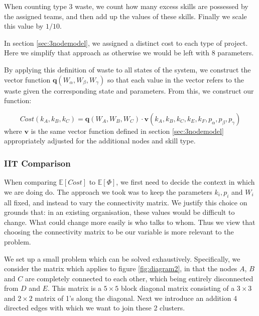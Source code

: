 When counting type 3 waste, we count how many excess skills are possessed by the assigned teams, and then add up the values of these skills. Finally we scale this value by $1/10$.

\begin{remark}
	In section \ref{sec:3nodemodel}, we assigned a distinct cost to each type of project. Here we simplify that approach as otherwise we would be left with 8 parameters.
\end{remark}

By applying this definition of waste to all states of the system, we construct the vector function $\mathbf{q}(W_\alpha, W_\beta, W_\gamma)$ so that each value in the vector refers to the waste given the corresponding state and parameters. From this, we construct our function:

\begin{equation}
\label{eq:cost_function}
Cost(k_A, k_B, k_C) = \mathbf{q}(W_A, W_B, W_C) \cdot \mathbf{v}(k_A, k_B, k_C,k_E, k_F, p_\alpha, p_\beta, p_\gamma)
\end{equation}
where $\mathbf{v}$ is the same vector function defined in section \ref{sec:3nodemodel} appropriately adjusted for the additional nodes and skill type.

\subsubsection{IIT Comparison}

When comparing $\mathbb{E}[Cost]$ to $\mathbb{E}[\Phi]$, we first need to decide the context in which we are doing do. The approach we took was to keep the parameters $k_i, p_i$ and $W_i$ all fixed, and instead to vary the connectivity matrix. We justify this choice on grounds that: in an existing organisation, these values would be difficult to change. What could change more easily is who talks to whom. Thus we view that choosing the connectivity matrix to be our variable is more relevant to the problem.


We set up a small problem which can be solved exhaustively. Specifically, we consider the matrix which applies to figure \ref{fig:diagram2}, in that the nodes $A$, $B$ and $C$ are completely connected to each other, which being entirely disconnected from $D$ and $E$. This matrix is a $5\times 5$ block diagonal matrix consisting of a $3 \times 3$ and $2 \times 2$ matrix of 1's along the diagonal. Next we introduce an addition 4 directed edges with which we want to join these 2 clusters.

